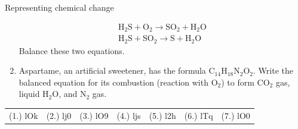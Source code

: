 \begin{eocexercises}{Representing chemical change}
\begin{enumerate}[noitemsep, label=\textbf{\arabic*}. ]
\begin{eqnarray*}
{\text{H}}_{2}\text{S} + {\text{O}}_{2} \to {\text{SO}}_{2} + {\text{H}}_{2}\text{O} \\ 
{\text{H}}_{2}\text{S} + {\text{SO}}_{2} \to \text{S} + {\text{H}}_{2}\text{O} 
      \end{eqnarray*}
Balance these two equations.
\label{m38727*uid46}\item Aspartame, an artificial sweetener, has the formula ${\text{C}}_{14}{\text{H}}_{18}{\text{N}}_{2}{\text{O}}_{2}$. Write the balanced equation for its combustion (reaction with ${\text{O}}_{2}$) to form ${\text{CO}}_{2}$ gas, liquid $\text{H}_{2}\text{O}$, and ${\text{N}}_{2}$ gas.
\end{enumerate}
\practiceinfo
\par 
 \par \begin{tabular}[h]{cccccc}
 (1.) lOk  &  (2.) lj0  &  (3.) lO9  &  (4.) ljs  &  (5.) l2h  &  (6.) lTq  &  (7.) lO0  & \end{tabular}
\end{eocexercises}
